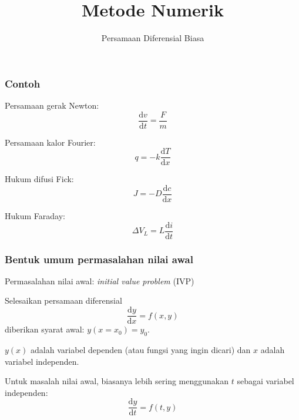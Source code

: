 



\title{Metode Numerik}
\subtitle{Persamaan Diferensial Biasa}
\date{}


\frame{\titlepage}


\begin{frame}
\frametitle{Contoh}

Persamaan gerak Newton:
\begin{equation*}
\frac{\mathrm{d}v}{\mathrm{d}t} = \frac{F}{m}
\end{equation*}

Persamaan kalor Fourier:
\begin{equation*}
q = -k \frac{\mathrm{d}T}{\mathrm{d}x}
\end{equation*}

Hukum difusi Fick:
\begin{equation*}
J = -D \frac{\mathrm{d}c}{\mathrm{d}x}
\end{equation*}

Hukum Faraday:
\begin{equation*}
\Delta V_{L} = L \frac{\mathrm{d}i}{\mathrm{d}t}
\end{equation*}

\end{frame}


\begin{frame}
\frametitle{Bentuk umum permasalahan nilai awal}

Permasalahan nilai awal: \textit{initial value problem} (IVP)

Selesaikan persamaan diferensial
\begin{equation}
\frac{\mathrm{d}y}{\mathrm{d}x} = f(x,y)
\label{eq:ode_gen01}
\end{equation}
diberikan syarat awal: $y(x=x_0) = y_0$.

$y(x)$ adalah variabel dependen (atau fungsi yang ingin dicari)
dan $x$ adalah variabel independen.

Untuk masalah nilai awal, biasanya lebih sering menggunakan $t$ sebagai
variabel independen:
\begin{equation}
\frac{\mathrm{d}y}{\mathrm{d}t} = f(t,y)
\label{eq:ode_gen02}
\end{equation}

\end{frame}

